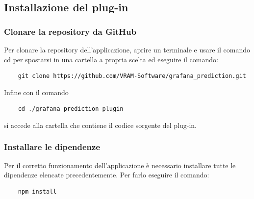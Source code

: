 
\subsection{Installazione del plug-in}
\subsubsection{Clonare la repository da GitHub}%
Per clonare la repository dell'applicazione, aprire un terminale e usare il comando cd per spostarsi in una cartella a propria scelta ed eseguire il comando:
\begin{verbatim}
	git clone https://github.com/VRAM-Software/grafana_prediction.git
\end{verbatim}
Infine con il comando 
\begin{verbatim}
	cd ./grafana_prediction_plugin
\end{verbatim}
si accede alla cartella che contiene il codice sorgente del plug-in.

\subsubsection{Installare le dipendenze}%
Per il corretto funzionamento dell'applicazione è necessario installare tutte le dipendenze elencate precedentemente. Per farlo eseguire il comando:
\begin{verbatim}
	npm install
\end{verbatim}

